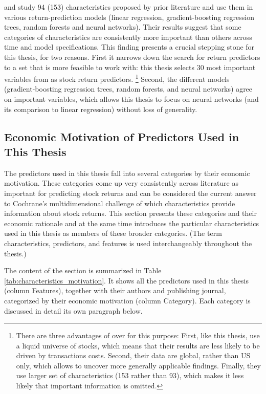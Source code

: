 			\cite{gu2020empirical} and \cite{tobek2020does} study 94 (153) characteristics proposed by prior literature and use them in various return-prediction models (linear regression, gradient-boosting regression trees, random forests and neural networks). Their results suggest that some categories of characteristics are consistently more important than others across time and model specifications. This finding presents a crucial stepping stone for this thesis, for two reasons. First it narrows down the search for return predictors to a set that is more feasible to work with: this thesis selects 30 most important variables from \cite{tobek2020does} as stock return predictors. \footnote{There are three advantages of \cite{tobek2020does} over \cite{gu2020empirical} for this purpose: First, like this thesis,  \cite{tobek2020does} use a liquid universe of stocks, which means that their results are less likely to be driven by transactions costs. Second, their data are global, rather than US only, which allows to uncover more generally applicable findings. Finally, they use larger set of characteristics (153 rather than 93), which makes it less likely that important information is omitted.} Second, the different models (gradient-boosting regression trees, random forests, and neural networks) agree on important variables, which allows this thesis to focus on neural networks (and its comparison to linear regression) without loss of generality. 
		
		\subsection {Economic Motivation of Predictors Used in This Thesis}
			\label{chap:economic_motivation_of_predictors}
			The predictors used in this thesis fall into several categories by their economic motivation. These categories come up very consistently across literature as important for predicting stock returns \cite{gu2020empirical, tobek2020does, harvey2016and, mclean2016does} and can be considered the current answer to Cochrane's multidimensional challenge of which characteristics provide information about stock returns. This section presents these categories and their economic rationale and at the same time introduces the particular characteristics used in this thesis as members of these broader categories. (The term characteristics, predictors, and features is used interchangeably throughout the thesis.)
			
			The content of the section is summarized in Table \ref{tab:characteristics_motivation}. It shows all the predictors used in this thesis (column Features), together with their authors and publishing journal, categorized by their economic motivation (column Category). Each category is discussed in detail its own paragraph below. 
			
